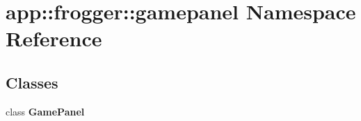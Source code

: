 \section{app::frogger::gamepanel Namespace Reference}
\label{namespaceapp_1_1frogger_1_1gamepanel}


\subsection*{Classes}
\begin{CompactItemize}
\item 
class {\bf GamePanel}
\end{CompactItemize}
